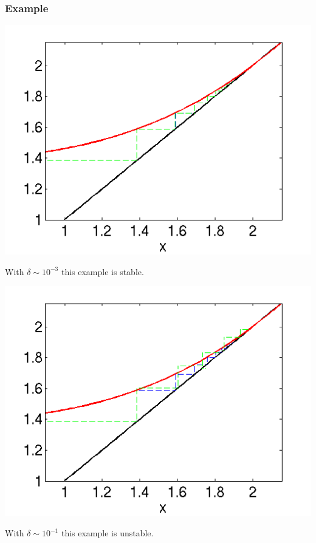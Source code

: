 \documentclass{beamer}
\begin{document}
\begin{frame}
  \frametitle{Example}

  \begin{overlayarea}{\textwidth}{0.9\textheight}
    {
      \begin{center}
        \includegraphics[height=0.8\textheight]{figures/ErrorExample1}
      \end{center}
      With $\delta \sim 10^{-3}$ this example is stable.
    }
    {
      \begin{center}
        \includegraphics[height=0.8\textheight]{figures/ErrorExample2c}
      \end{center}
      With $\delta \sim 10^{-1}$ this example is unstable.
}
\end{overlayarea}
\end{frame}
\end{document}
